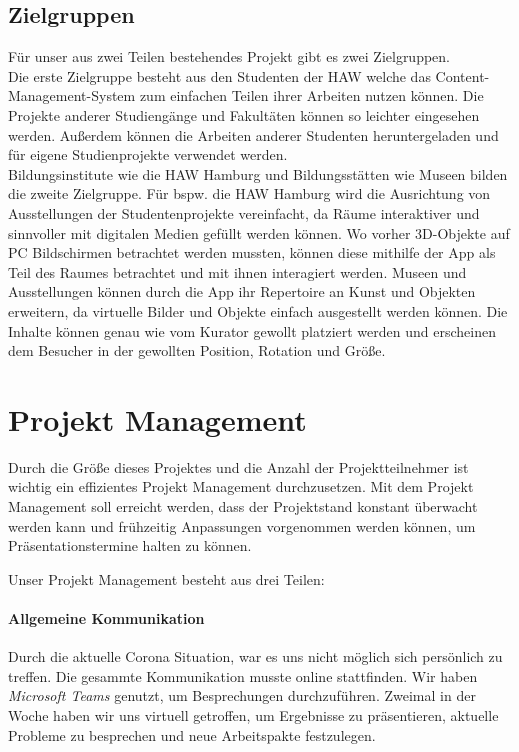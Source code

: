 \documentclass[titlepage, a4paper, 11pt]{scrartcl}
\begin{document}
    \subsection{Zielgruppen}
      Für unser aus zwei Teilen bestehendes Projekt gibt es zwei Zielgruppen.\\
      Die erste Zielgruppe besteht aus den Studenten der HAW welche das Content-Management-System zum einfachen Teilen ihrer Arbeiten nutzen können. 
      Die Projekte anderer Studiengänge und Fakultäten können so leichter eingesehen werden. Außerdem können die Arbeiten anderer Studenten heruntergeladen und für eigene Studienprojekte verwendet werden.\\

      Bildungsinstitute wie die HAW Hamburg und Bildungsstätten wie Museen bilden die zweite Zielgruppe. 
      Für bspw. die HAW Hamburg wird die Ausrichtung von Ausstellungen der Studentenprojekte vereinfacht, da Räume interaktiver und sinnvoller mit digitalen Medien gefüllt werden können. 
      Wo vorher 3D-Objekte auf PC Bildschirmen betrachtet werden mussten, können diese mithilfe der App als Teil des Raumes betrachtet und mit ihnen interagiert werden. 
      Museen und Ausstellungen können durch die App ihr Repertoire an Kunst und Objekten erweitern, da virtuelle Bilder und Objekte einfach ausgestellt werden können. 
      Die Inhalte können genau wie vom Kurator gewollt platziert werden und erscheinen dem Besucher in der gewollten Position, Rotation und Größe.


      \section{Projekt Management}

      Durch die Größe dieses Projektes und die Anzahl der Projektteilnehmer ist wichtig ein effizientes Projekt Management durchzusetzen.
      Mit dem Projekt Management soll erreicht werden, dass der Projektstand konstant überwacht werden kann und frühzeitig Anpassungen vorgenommen werden können, um Präsentationstermine halten zu können.
      
      Unser Projekt Management besteht aus drei Teilen:
    
    \paragraph{Allgemeine Kommunikation}
      Durch die aktuelle Corona Situation, war es uns nicht möglich sich persönlich zu treffen.
      Die gesammte Kommunikation musste online stattfinden.
      Wir haben \textit{Microsoft Teams} genutzt, um Besprechungen durchzuführen.
      Zweimal in der Woche haben wir uns virtuell getroffen, um Ergebnisse zu präsentieren, aktuelle Probleme zu besprechen und neue Arbeitspakte festzulegen.
    
\end{document}
